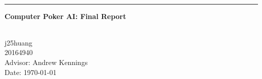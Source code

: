 \begin{titlepage}
\begin{center}


      \huge \textbf{\thetitle}
\\[0.30em]	  {\hrule height0.02em}

\vspace{0.5em}
	\Large \textbf{Computer Poker AI: Final Report}

    \vfill
    \small
	\textbf{\theauthor}
\\[1.2em]
    
	j25huang
	\\20164940
\\[3em]
	
	Advisor: Andrew Kennings
    \\Date: \today


\end{center}
\end{titlepage}
\clearpage
